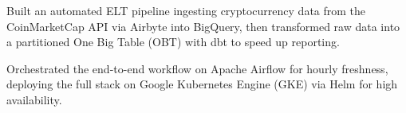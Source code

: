 
\vspace{3pt}
\begin{resume_list}
  \item Built an automated ELT pipeline ingesting cryptocurrency data from the CoinMarketCap API via Airbyte into BigQuery, then transformed raw data into a partitioned One Big Table (OBT) with dbt to speed up reporting.
  \item Orchestrated the end-to-end workflow on Apache Airflow for hourly freshness, deploying the full stack on Google Kubernetes Engine (GKE) via Helm for high availability.
\end{resume_list}
